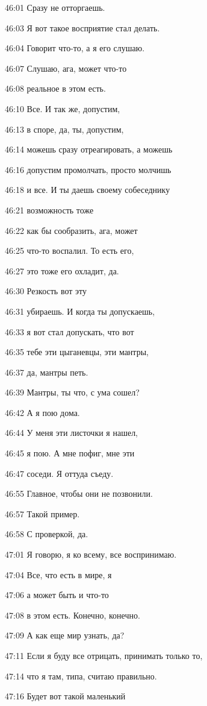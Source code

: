 46:01
Сразу не отторгаешь.

46:03
Я вот такое восприятие стал делать.

46:04
Говорит что-то, а я его слушаю.

46:07
Слушаю, ага, может что-то

46:08
реальное в этом есть.

46:10
Все. И так же, допустим,

46:13
в споре, да, ты, допустим,

46:14
можешь сразу отреагировать, а можешь

46:16
допустим промолчать, просто молчишь

46:18
и все. И ты даешь своему собеседнику

46:21
возможность тоже

46:22
как бы сообразить, ага, может

46:25
что-то воспалил. То есть его,

46:27
это тоже его охладит, да.

46:30
Резкость вот эту

46:31
убираешь. И когда ты допускаешь,

46:33
я вот стал допускать, что вот

46:35
тебе эти цыганевцы, эти мантры,

46:37
да, мантры петь.

46:39
Мантры, ты что, с ума сошел?

46:42
А я пою дома.

46:44
У меня эти листочки я нашел,

46:45
я пою. А мне пофиг, мне эти

46:47
соседи. Я оттуда съеду.

46:55
Главное, чтобы они не позвонили.

46:57
Такой пример.

46:58
С проверкой, да.

47:01
Я говорю, я ко всему, все воспринимаю.

47:04
Все, что есть в мире, я

47:06
а может быть и что-то

47:08
в этом есть. Конечно, конечно.

47:09
А как еще мир узнать, да?

47:11
Если я буду все отрицать, принимать только то,

47:14
что я там, типа, считаю правильно.

47:16
Будет вот такой маленький

